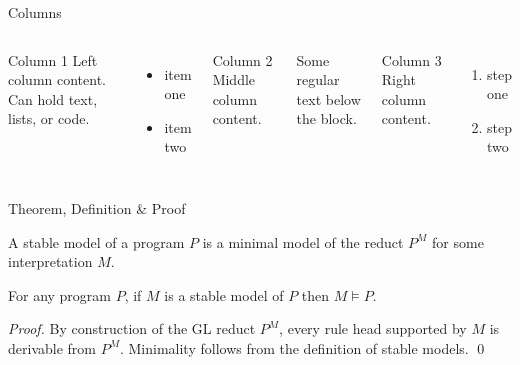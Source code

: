 \begin{frame}{Columns}

  \begin{columns}[T]
      \begin{block}{Column 1}
        Left column content. Can hold text, lists, or code.
      \end{block}
      \begin{itemize}
        \item item one
        \item item two
      \end{itemize}

      \begin{exampleblock}{Column 2}
        Middle column content.
      \end{exampleblock}
      Some regular text below the block.

      \begin{alertblock}{Column 3}
        Right column content.
      \end{alertblock}
      \begin{enumerate}
        \item step one
        \item step two
      \end{enumerate}
  \end{columns}

\end{frame}


\begin{frame}{Theorem, Definition \& Proof}

  \begin{definition}
    A \alert{stable model} of a program $P$ is a minimal model of
    the reduct $P^M$ for some interpretation $M$.
  \end{definition}

  \begin{theorem}
    For any program $P$, if $M$ is a stable model of $P$ then
    $M \models P$.
  \end{theorem}

  \begin{proof}
    By construction of the GL reduct $P^M$, every rule head
    supported by $M$ is derivable from $P^M$. Minimality
    follows from the definition of stable models. \qed
  \end{proof}

\end{frame}


